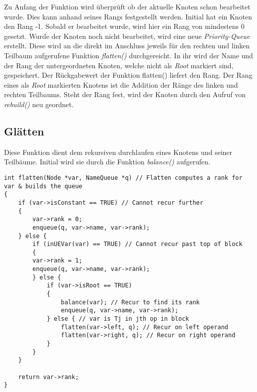 Zu Anfang der Funktion wird überprüft ob der aktuelle Knoten schon bearbeitet wurde. Dies kann anhand seines Rangs festgestellt werden. Initial hat ein Knoten den Rang -1. Sobald er bearbeitet wurde, wird hier ein Rang von mindestens 0 gesetzt. Wurde der Knoten noch nicht bearbeitet, wird eine neue \textit{Priority-Queue} erstellt. Diese wird an die direkt im Anschluss jeweils für den rechten und linken Teilbaum aufgerufene Funktion \textit{flatten()} durchgereicht. In ihr wird der Name und der Rang der untergeordneten Knoten, welche nicht als \textit{Root} markiert sind, gespeichert. Der Rückgabewert der Funktion flatten() liefert den Rang. Der Rang eines als \textit{Root} markierten Knotens ist die Addition der Ränge des linken und rechten Teilbaums. Steht der Rang fest, wird der Knoten durch den Aufruf von \textit{rebuild()} neu geordnet.

\subsection{Glätten}
Diese Funktion dient dem rekursiven durchlaufen eines Knotens und seiner Teilbäume. Initial wird sie durch die Funktion \textit{balance()} aufgerufen.\\

\begin{lstlisting}[caption=Funktion flatten(), label=list:Funktion flatten()]
int flatten(Node *var, NameQueue *q) // Flatten computes a rank for var & builds the queue
{
	if (var->isConstant == TRUE) // Cannot recur further
	{
		var->rank = 0;
		enqueue(q, var->name, var->rank);
	} else {
		if (inUEVar(var) == TRUE) // Cannot recur past top of block
		{
		var->rank = 1;
		enqueue(q, var->name, var->rank);
		} else {
			if (var->isRoot == TRUE)
			{
				balance(var); // Recur to find its rank
				enqueue(q, var->name, var->rank);
			} else { // var is Tj in jth op in block
				flatten(var->left, q); // Recur on left operand
				flatten(var->right, q); // Recur on right operand
			}
		}
	}

	return var->rank;
}
\end{lstlisting}

